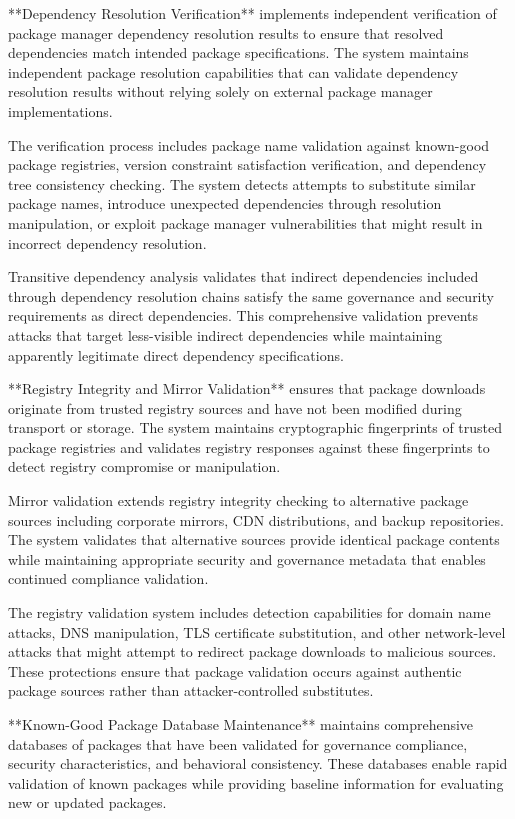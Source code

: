 **Dependency Resolution Verification** implements independent verification of package manager dependency resolution results to ensure that resolved dependencies match intended package specifications. The system maintains independent package resolution capabilities that can validate dependency resolution results without relying solely on external package manager implementations.

The verification process includes package name validation against known-good package registries, version constraint satisfaction verification, and dependency tree consistency checking. The system detects attempts to substitute similar package names, introduce unexpected dependencies through resolution manipulation, or exploit package manager vulnerabilities that might result in incorrect dependency resolution.

Transitive dependency analysis validates that indirect dependencies included through dependency resolution chains satisfy the same governance and security requirements as direct dependencies. This comprehensive validation prevents attacks that target less-visible indirect dependencies while maintaining apparently legitimate direct dependency specifications.

**Registry Integrity and Mirror Validation** ensures that package downloads originate from trusted registry sources and have not been modified during transport or storage. The system maintains cryptographic fingerprints of trusted package registries and validates registry responses against these fingerprints to detect registry compromise or manipulation.

Mirror validation extends registry integrity checking to alternative package sources including corporate mirrors, CDN distributions, and backup repositories. The system validates that alternative sources provide identical package contents while maintaining appropriate security and governance metadata that enables continued compliance validation.

The registry validation system includes detection capabilities for domain name attacks, DNS manipulation, TLS certificate substitution, and other network-level attacks that might attempt to redirect package downloads to malicious sources. These protections ensure that package validation occurs against authentic package sources rather than attacker-controlled substitutes.

**Known-Good Package Database Maintenance** maintains comprehensive databases of packages that have been validated for governance compliance, security characteristics, and behavioral consistency. These databases enable rapid validation of known packages while providing baseline information for evaluating new or updated packages.

